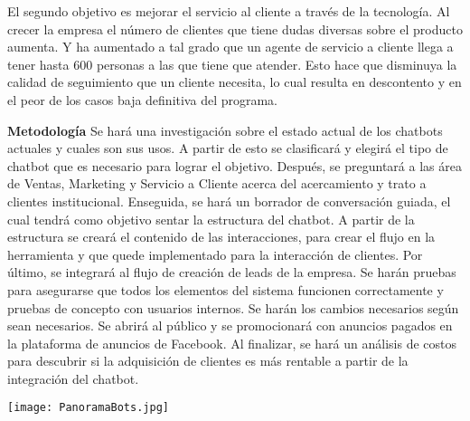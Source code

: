 El segundo objetivo es mejorar el servicio al cliente a través de la tecnología. Al crecer la empresa el número de clientes que tiene dudas diversas sobre el producto aumenta. Y ha aumentado a tal grado que un agente de servicio a cliente llega a tener hasta 600 personas a las que tiene que atender. Esto hace que disminuya la calidad de seguimiento que un cliente necesita, lo cual resulta en descontento y en el peor de los casos baja definitiva del programa.

\textbf{Metodología}
Se hará una investigación sobre el estado actual de los chatbots actuales y cuales son sus usos. A partir de esto se clasificará y elegirá el tipo de chatbot que es necesario para lograr el objetivo. 
Después, se preguntará a las área de Ventas, Marketing y Servicio a Cliente acerca del acercamiento y trato a clientes institucional. 
Enseguida, se hará un borrador de conversación guiada, el cual tendrá como objetivo sentar la estructura del chatbot. A partir de la estructura se creará el contenido de las interacciones, para crear el flujo en la herramienta y que quede implementado para la interacción de clientes.
Por último, se integrará al flujo de creación de leads de la empresa. Se harán pruebas para asegurarse que todos los elementos del sistema funcionen correctamente y pruebas de concepto con usuarios internos. Se harán los cambios necesarios según sean necesarios. Se abrirá al público y se promocionará con anuncios pagados en la plataforma de anuncios de Facebook. Al finalizar, se hará un análisis de costos para descubrir si la adquisición de clientes es más rentable a partir de la integración del chatbot.

\texttt{[image: PanoramaBots.jpg]}

